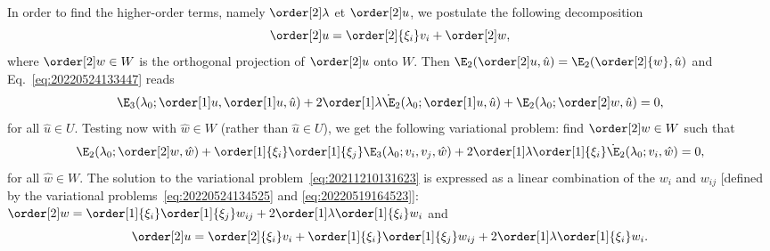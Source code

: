 In order to find the higher-order terms, namely $\order[2]\lambda$ et $\order[2]u$, we postulate the following
decomposition
\begin{equation}
  \order[2]u = \order[2]{\xi_i} v_i + \order[2]w,
\end{equation}
where $\order[2]w \in W$ is the orthogonal projection of $\order[2]u$ onto $W$. Then
$\E_2(\order[2]u, \hat{u}) = \E_2(\order[2]{w}, \hat{u})$ and Eq.~\eqref{eq:20220524133447} reads
\begin{equation}
 \E_3(\lambda_0; \order[1]u, \order[1]u, \hat{u}) + 2\order[1]\lambda \dot{\E}_2(\lambda_0; \order[1]u, \hat{u}) + \E_2(\lambda_0; \order[2]w, \hat{u}) = 0,
\end{equation}
for all $\hat{u} \in U$. Testing now with $\hat{w} \in W$ (rather than $\hat{u} \in U$), we get the following
variational problem: find $\order[2]w \in W$ such that
\begin{equation}
  \label{eq:20211210131623}
  \E_2(\lambda_0; \order[2]w, \hat{w}) + \order[1]{\xi_i} \order[1]{\xi_j} \E_3(\lambda_0; v_i, v_j, \hat{w}) + 2\order[1]\lambda \order[1]{\xi_i} \dot{\E}_2(\lambda_0; v_i, \hat{w}) = 0,
\end{equation}
for all $\hat{w} \in W$. The solution to the variational problem~\eqref{eq:20211210131623} is expressed as a linear
combination of the $w_i$ and $w_{ij}$ [defined by the variational problems~\eqref{eq:20220524134525} and
\eqref{eq:20220519164523}]:
$\order[2]w = \order[1]{\xi_i} \order[1]{\xi_j} w_{ij} + 2\order[1]\lambda \order[1]{\xi_i} w_i$ and
\begin{equation}
  \label{eq:20220524134613}
  \order[2]u = \order[2]{\xi_i} v_i + \order[1]{\xi_i} \order[1]{\xi_j} w_{ij} + 2\order[1]\lambda \order[1]{\xi_i} w_i.
\end{equation}

